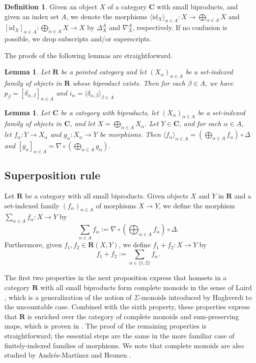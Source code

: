 \documentclass[12pt]{tac}
\newtheorem{lemma}[theorem]{Lemma}
\theoremstyle{definition}
\newtheorem{definition}[theorem]{Definition}
\theoremstyle{remark}
\newcommand{\<}{\langle}
\renewcommand{\>}{\rangle}
\renewcommand{\:}{\colon}
\newcommand{\id}{\mathrm{id}}
\begin{document}
\begin{definition}
Given an object $X$ of a category $\mathbf C$ with small biproducts, and given an index set $A$, we denote the morphisms $\langle \id_X\rangle_{\alpha\in A}:X\to\bigoplus_{\alpha\in A}X$ and $[\id_X]_{\alpha\in A}:\bigoplus_{\alpha\in A}X\to X$ by $\Delta_X^A$ and $\nabla_X^A$, respectively. If no confusion is possible, we drop subscripts and/or superscripts.
\end{definition}


The proofs of the following lemmas are straightforward.
\begin{lemma}\label{lem:projection and injection}
    Let $\mathbf R$ be a pointed category and let $(X_\alpha)_{\alpha\in A}$ be a set-indexed family of objects in $\mathbf R$ whose biproduct exists. Then for each $\beta\in A$, we have $p_\beta=[\delta_{\alpha,\beta}]_{\alpha\in A}$ and $i_\alpha=\langle \delta_{\alpha,\beta}\rangle_{\beta\in A}$
\end{lemma}

\begin{lemma}\label{lem:nabladeltabiproduct}
    Let $\mathbf C$ be a category with biproducts, let $(X_\alpha)_{\alpha\in A}$ be a set-indexed family of objects in $\mathbf C$, and let $X=\bigoplus_{\alpha\in A}X_\alpha$. Let $Y\in\mathbf C$, and for each $\alpha\in A$, let $f_\alpha:Y\to X_\alpha$ and $g_\alpha:X_\alpha\to Y$ be morphisms. Then
   $\langle f_\alpha\rangle_{\alpha\in A}=\left(\bigoplus_{\alpha\in A}f_\alpha\right)\circ\Delta$ and $[g_\alpha]_{\alpha\in A}=\nabla\circ\left(\bigoplus_{\alpha\in A}g_\alpha\right)$.
\end{lemma}


\subsection{Superposition rule}


    Let $\mathbf R$ be a category with all small biproducts. Given objects $X$ and $Y$ in $\mathbf R$ and a set-indexed family  $(f_\alpha)_{\alpha\in A}$ of morphisms $X\to Y$, we define the morphism $\sum_{\alpha\in A}f_\alpha:X\to Y$ by \[ \sum_{\alpha\in A}f_\alpha :=\nabla\circ\left(\bigoplus_{\alpha\in A}f_\alpha\right)\circ\Delta.\] 
    Furthermore, given $f_1,f_2\in\mathbf R(X,Y)$, we define $f_1+f_2:X\to Y$ by \[f_1+f_2:=\sum_{\alpha\in\{1,2\}}f_\alpha.\]

The first two properties in the next proposition express that homsets in a category $\mathbf R$ with all small biproducts form complete monoids in the sense of Laird \cite{Laird}, which is a generalization of the notion of $\Sigma$-monoids introduced by Haghverdi \cite{haghverdi_2000} to the uncountable case. Combined with the sixth property, these properties express that $\mathbf R$ is enriched over the category of complete monoids and sum-preserving maps, which is proven in \cite[Proposition 2.3]{Laird}. The proof of the remaining properties is straightforward; the essential steps are the same in the more familiar case of finitely-indexed families of morphisms. We note that complete monoids are also studied by Andr\'es-Mart\'inez and Heunen \cite{AndresMartinez-Heunen}.
\end{document}
